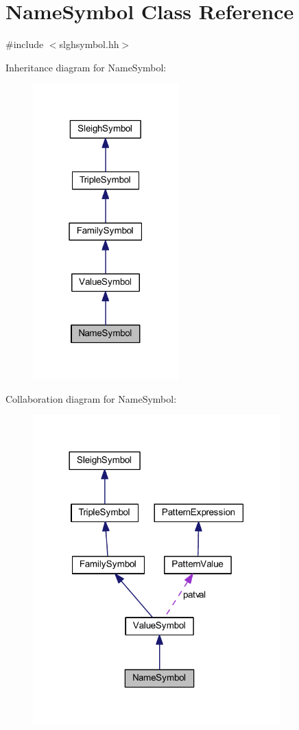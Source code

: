 \hypertarget{class_name_symbol}{}\section{Name\+Symbol Class Reference}
\label{class_name_symbol}


{\ttfamily \#include $<$slghsymbol.\+hh$>$}



Inheritance diagram for Name\+Symbol\+:
\nopagebreak
\begin{figure}[H]
\begin{center}
\leavevmode
\includegraphics[width=159pt]{class_name_symbol__inherit__graph}
\end{center}
\end{figure}


Collaboration diagram for Name\+Symbol\+:
\nopagebreak
\begin{figure}[H]
\begin{center}
\leavevmode
\includegraphics[width=270pt]{class_name_symbol__coll__graph}
\end{center}
\end{figure}

